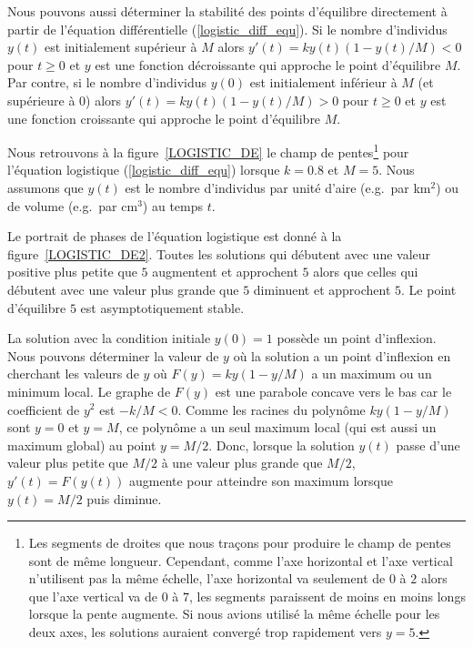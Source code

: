 {Nous pouvons aussi déterminer la stabilité des points d'équilibre
directement à partir de l'équation différentielle
(\ref{logistic_diff_equ}).   Si le nombre d'individus $y(t)$ est
initialement supérieur à $M$ alors $y'(t) = ky(t)(1-y(t)/M)< 0$
pour $t\geq 0$ et $y$ est une fonction décroissante qui approche le
point d'équilibre $M$.  Par contre, si le nombre d'individus $y(0)$
est initialement inférieur à $M$ (et supérieure à $0$) alors
$y'(t) = k y(t)(1-y(t)/M)>0$ pour $t\geq 0$ et $y$ est une fonction
croissante qui approche le point d'équilibre $M$.

Nous retrouvons à la figure~\ref{LOGISTIC_DE} le champ de
pentes\footnote{Les segments de droites que nous traçons pour produire
  le champ de pentes sont de même longueur.  Cependant, comme l'axe
  horizontal et l'axe vertical n'utilisent pas la même échelle, l'axe
  horizontal va seulement de $0$ à $2$ alors que l'axe vertical va de
  $0$ à $7$, les segments paraissent de moins en moins longs lorsque
  la pente augmente.  Si nous avions utilisé la même échelle pour les deux
  axes, les solutions auraient convergé trop rapidement vers $y=5$.}
pour l'équation logistique (\ref{logistic_diff_equ}) lorsque $k=0.8$
et $M=5$. Nous assumons que $y(t)$ est le nombre d'individus par unité
d'aire (e.g.\ par km$^2$) ou de volume (e.g.\ par cm$^3$) au temps $t$.

Le portrait de phases de l'équation logistique est donné à la
figure~\ref{LOGISTIC_DE2}.  Toutes les solutions qui débutent avec une
valeur positive plus petite que $5$ augmentent et approchent $5$ alors que
celles qui débutent avec une valeur plus grande que $5$ diminuent et
approchent $5$.  Le point d'équilibre $5$ est asymptotiquement
stable.



La solution avec la condition initiale $y(0)=1$ possède un point
d'inflexion.  Nous pouvons déterminer la valeur de $y$ où la solution a un
point d'inflexion en cherchant les valeurs de $y$ où
$F(y) = ky(1-y/M)$ a un maximum ou un minimum local.  Le graphe de
$F(y)$ est une parabole concave vers le bas car le coefficient de
$y^2$ est $-k/M < 0$.  Comme les racines du polynôme $ky(1-y/M)$ sont
$y=0$ et $y=M$, ce polynôme a un seul maximum local (qui est aussi un
maximum global) au point $y = M/2$.  Donc, lorsque la solution $y(t)$
passe d'une valeur plus petite que $M/2$ à une valeur plus grande que
$M/2$, $y'(t) = F(y(t))$ augmente pour atteindre son maximum lorsque
$y(t) = M/2$ puis diminue. 

}
